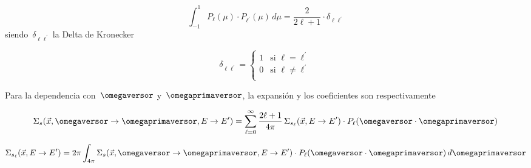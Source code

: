 \begin{equation*}
 \int_{-1}^{1} P_\ell(\mu) \cdot P_{\ell^\prime}(\mu) \, d\mu = \frac{2}{2\ell + 1} \cdot \delta_{\ell \ell^\prime}
\end{equation*}
%
siendo~$\delta_{\ell \ell^\prime}$ la Delta de Kronecker

\begin{equation*}
 \delta_{\ell \ell^\prime} =
\begin{cases}
 1 & \text{si $\ell = \ell^\prime$} \\
 0 & \text{si $\ell \neq \ell^\prime$} \\
\end{cases}
\end{equation*}

% 

Para la dependencia con~$\omegaversor$ y~$\omegaprimaversor$, la expansión y los coeficientes son respectivamente

\begin{equation}\label{eq:sigmalegendreomega}
\Sigma_s(\vec{x}, \omegaversor \rightarrow \omegaprimaversor, E \rightarrow E^\prime) = \sum_{\ell=0}^{\infty} \frac{2\ell + 1}{4\pi} \, \Sigma_{s_\ell}(\vec{x}, E \rightarrow E^{\prime}) \cdot P_\ell(\omegaversor \cdot \omegaprimaversor)  
\end{equation}

\begin{equation}\label{eq:coeflegendreomega}
 \Sigma_{s_\ell}(\vec{x}, E\rightarrow E^{\prime}) =
 2\pi \int_{4\pi} \Sigma_s(\vec{x}, \omegaversor \rightarrow \omegaprimaversor, E\rightarrow E^\prime) \cdot P_\ell(\omegaversor \cdot \omegaprimaversor) \, d\omegaprimaversor
\end{equation}


